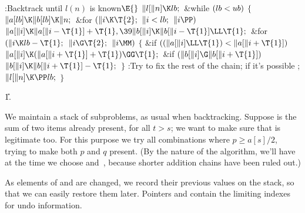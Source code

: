 \Y\B\4:Backtrack until $l(n)$ is known\X${}\E{}$\6
$\|l[\|n]\K\\{lb};{}$\6
\&{while} ${}(\\{lb}<\\{ub}){}$\5
${}\{{}$\1\6
${}\|a[\\{lb}]\K\|b[\\{lb}]\K\|n;{}$\6
\&{for} ${}(\|i\K\T{2};{}$ ${}\|i<\\{lb};{}$ ${}\|i\PP){}$\1\5
${}\|a[\|i]\K\|a[\|i-\T{1}]+\T{1},\39\|b[\|i]\K\|b[\|i-\T{1}]\LL\T{1};{}$\2\6
\&{for} ${}(\|i\K\\{lb}-\T{1};{}$ ${}\|i\G\T{2};{}$ ${}\|i\MM){}$\5
${}\{{}$\1\6
\&{if} ${}((\|a[\|i]\LL\T{1})<\|a[\|i+\T{1}]){}$\1\5
${}\|a[\|i]\K(\|a[\|i+\T{1}]+\T{1})\GG\T{1};{}$\2\6
\&{if} ${}(\|b[\|i]\G\|b[\|i+\T{1}]){}$\1\5
${}\|b[\|i]\K\|b[\|i+\T{1}]-\T{1};{}$\2\6
\4${}\}{}$\2\6
:Try to fix the rest of the chain;  if it's possible%
\X;\6
${}\|l[\|n]\K\PP\\{lb};{}$\6
\4${}\}{}$\2\par
\U1.\fi

We maintain a stack of subproblems, as usual when
backtracking.
Suppose  is the sum of two items already present, for all
$t>s$; we want to make sure that  is legitimate too.
For this purpose we try all combinations  where
$p\ge a[s]/2$, trying to make both $p$ and $q$ present.
(By the nature of the algorithm, we'll have  at
the time we choose  and~, because shorter addition
chains have been ruled out.)

As elements of  and  are changed, we record their previous
values on the  stack, so that we can easily restore them
later. Pointers  and  contain the limiting indexes
for undo information.


